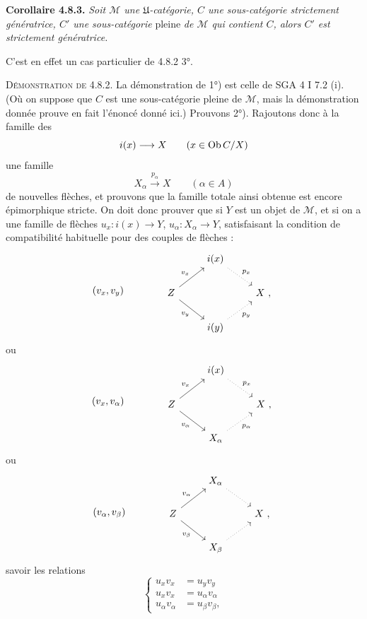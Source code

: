 \textbf{Corollaire 4.8.3.} \textit{Soit $\mathcal{M}$ une $\mathfrak{U}$-catégorie, $C$ une sous-catégorie strictement génératrice, $C'$ une sous-catégorie} pleine \textit{de $\mathcal{M}$ qui contient $C$, alors $C'$ est strictement génératrice.}

C'est en effet un cas particulier de 4.8.2 3°.


\textsc{Démonstration de 4.8.2}. La démonstration de 1°) est celle de SGA 4 I 7.2 (i). (Où on suppose que $C$ est une sous-catégorie pleine de $\mathcal{M}$, mais la démonstration donnée prouve en fait l'énoncé donné ici.) Prouvons 2°). Rajoutons donc à la famille des
\[ i(x) \longrightarrow X \qquad (x \in \operatorname{Ob} C/X) \]
une famille
\[ X_\alpha \xrightarrow{p_\alpha} X \qquad (\alpha \in A) \]
de nouvelles flèches, et prouvons que la famille totale ainsi obtenue est encore épimorphique stricte. On doit donc prouver que si $Y$ est un objet de $\mathcal{M}$, et si on a une famille de flèches $u_x : i(x) \longrightarrow Y$, $u_\alpha : X_\alpha \longrightarrow Y$, satisfaisant la condition de compatibilité habituelle pour des couples de flèches :
\[ (v_x,v_y) \qquad\qquad \begin{tikzcd}
& i(x) \arrow[dr, dotted, "p_x"] & \\
Z \arrow[ur, "v_x"] \arrow[dr, "v_y"'] & & X\ , \\
& i(y) \arrow[ur, dotted, "p_y"'] &
\end{tikzcd} \]
ou
\[ (v_x,v_\alpha) \qquad\qquad \begin{tikzcd}
& i(x) \arrow[dr, dotted, "p_x"] & \\
Z \arrow[ur, "v_x"] \arrow[dr, "v_\alpha"'] & & X\ , \\
& X_\alpha \arrow[ur, dotted, "p_\alpha"'] &
\end{tikzcd} \]
ou
\[ (v_\alpha,v_\beta) \qquad\qquad \begin{tikzcd}
& X_\alpha \arrow[dr, dotted] & \\
Z \arrow[ur, "v_\alpha"] \arrow[dr, "v_\beta"'] & & X\ , \\
& X_\beta \arrow[ur, dotted] &
\end{tikzcd} \]
savoir les relations
\[ \left\{\begin{aligned}
u_xv_x &= u_yv_y\\
u_xv_x &= u_\alpha v_\alpha\\
u_\alpha v_\alpha &= u_\beta v_\beta ,
\end{aligned}\right. \tag*{($*$)} \]
